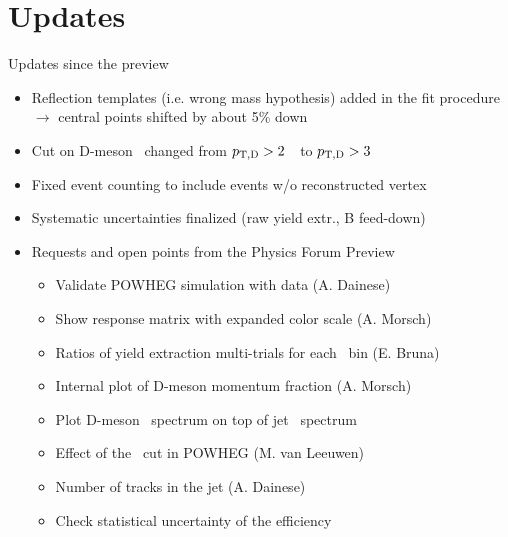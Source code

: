 \documentclass[xcolor={usenames,dvipsnames}]{beamer}
\begin{document}
\section{Updates}

\begin{frame}{Updates since the preview}

{\small
\begin{itemize}
\item Reflection templates (i.e. wrong mass hypothesis) added in the fit procedure $\rightarrow$ central points shifted by about 5\% down
\item Cut on D-meson \pt\ changed from $p_{\mathrm{T,D}}>2$~\GeVc\ to $p_{\mathrm{T,D}}>3$~\GeVc\
\item Fixed event counting to include events w/o reconstructed vertex 
\item Systematic uncertainties finalized (raw yield extr., B feed-down)
\item Requests and open points from the Physics Forum Preview
\begin{itemize}
\item \textcolor{BrickRed}{Validate POWHEG simulation with data} (A. Dainese)
\item Show response matrix with expanded color scale (A. Morsch)
\item Ratios of yield extraction multi-trials for each \ptd\ bin (E. Bruna)
\item \textcolor{BrickRed}{Internal plot of D-meson momentum fraction} (A. Morsch)
\item \textcolor{BrickRed}{Plot D-meson \pt\ spectrum on top of jet \pt\ spectrum}
\item \textcolor{BrickRed}{Effect of the \ptd\ cut in POWHEG} (M. van Leeuwen)
\item \textcolor{BrickRed}{Number of tracks in the jet} (A. Dainese)
\item Check statistical uncertainty of the efficiency
\end{itemize}
\end{itemize}
}
\end{frame}
\end{document}
